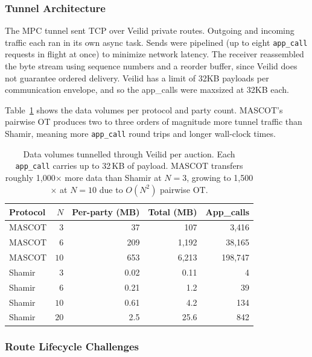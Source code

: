 \subsubsection{Tunnel Architecture}

The MPC tunnel sent TCP over Veilid private routes.  Outgoing and incoming
traffic each ran in its own async task.  Sends were pipelined (up to eight
\texttt{app\_call} requests in flight at once) to minimize network latency.
The receiver reassembled the byte stream using sequence numbers and a reorder
buffer, since Veilid does not guarantee ordered delivery. Veilid has a limit of 32KB payloads
per communication envelope, and so the app\_calls were maxsized at 32KB each.

Table~\ref{tab:tunnel-volumes} shows the data volumes per protocol and party
count.  MASCOT's pairwise OT produces two to three orders of magnitude more
tunnel traffic than Shamir, meaning more \texttt{app\_call} round trips and
longer wall-clock times.

\begin{table}[H]
\centering
\small
\begin{tabular}{lrrrr}
\toprule
\textbf{Protocol} & $N$ & \textbf{Per-party (MB)} & \textbf{Total (MB)} &
  \textbf{App\_calls} \\
\midrule
MASCOT & $3$  & 37   & 107   & 3,416 \\
MASCOT & $6$  & 209  & 1,192 & 38,165 \\
MASCOT & $10$ & 653  & 6,213 & 198,747 \\
\midrule
Shamir & $3$  & 0.02  & 0.11  & 4 \\
Shamir & $6$  & 0.21  & 1.2   & 39 \\
Shamir & $10$ & 0.61  & 4.2   & 134 \\
Shamir & $20$ & 2.5   & 25.6  & 842 \\
\bottomrule
\end{tabular}
\caption{Data volumes tunnelled through Veilid per auction.  Each
  \texttt{app\_call} carries up to 32\,KB of payload.  MASCOT transfers
  roughly 1,000$\times$ more data than Shamir at $N{=}3$, growing to
  1,500$\times$ at $N{=}10$ due to $O(N^2)$ pairwise OT.}
\label{tab:tunnel-volumes}
\end{table}

\subsubsection{Route Lifecycle Challenges}

